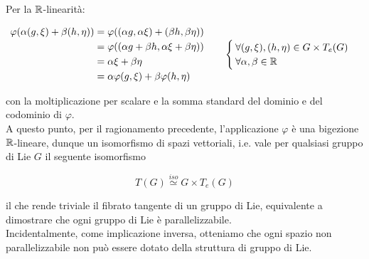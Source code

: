 {Per la $ \mathbb{R} $-linearità:

\begin{align}
	\begin{split}
		\varphi(\alpha (g,\xi) + \beta (h,\eta)) &= \varphi((\alpha g,\alpha \xi) + (\beta h,\beta \eta)) \\
		&= \varphi((\alpha g + \beta h,\alpha \xi + \beta \eta)) \\
		&= \alpha \xi + \beta \eta \\
		&= \alpha \varphi(g,\xi) + \beta \varphi(h,\eta)
	\end{split} %
	\qquad %
	\begin{cases}
		\forall (g,\xi),(h,\eta) \in G \times T_{e}(G) \\
		\forall \alpha,\beta \in \R
	\end{cases}
\end{align}

con la moltiplicazione per scalare e la somma standard del dominio e del codominio di $ \varphi $. \\
A questo punto, per il ragionamento precedente, l'applicazione $ \varphi $ è una bigezione $ \mathbb{R} $-lineare, dunque un isomorfismo di spazi vettoriali, i.e. vale per qualsiasi gruppo di Lie $ G $ il seguente isomorfismo

\begin{equation}
	T(G) \stackrel{iso}{\simeq} G \times T_{e}(G)
\end{equation}

il che rende triviale il fibrato tangente di un gruppo di Lie, equivalente a dimostrare che ogni gruppo di Lie è parallelizzabile. \\
Incidentalmente, come implicazione inversa, otteniamo che ogni spazio non parallelizzabile non può essere dotato della struttura di gruppo di Lie.
}
